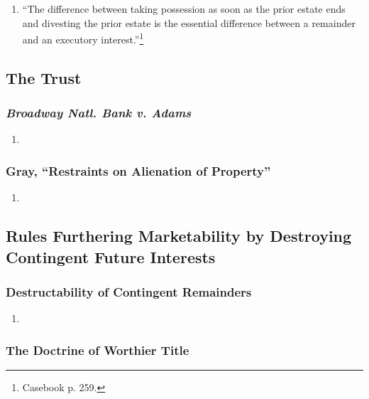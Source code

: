 \begin{enumerate}
    \item ``The difference between taking possession as soon as the prior 
    estate ends and divesting the prior estate is the essential difference 
    between a remainder and an executory interest.''\footnote{Casebook p. 259.}
\end{enumerate}

\subsection{The Trust}

\subsubsection{\emph{Broadway Natl. Bank v. Adams}}

\begin{enumerate}
    \item %
\end{enumerate}

\subsubsection{Gray, ``Restraints on Alienation of Property''}

\begin{enumerate}
    \item %
\end{enumerate}

\subsection{Rules Furthering Marketability by Destroying Contingent Future 
Interests}

\subsubsection{Destructability of Contingent Remainders}

\begin{enumerate}
    \item %
\end{enumerate}

\subsubsection{The Doctrine of Worthier Title}

